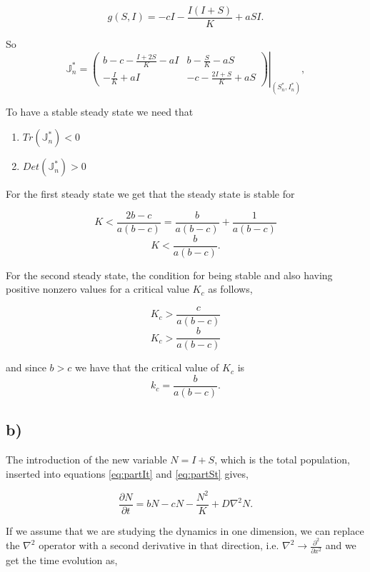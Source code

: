 \begin{equation}
g(S,I)=-cI-\frac{I(I+S)}{K}+aSI.
\end{equation}

So
\begin{equation}
\mathbb{J}^*_n=\left.\left(
\begin{array}{cc}
b-c-\frac{I+2S}{K}-aI & b-\frac{S}{K}-aS \\
-\frac{I}{K} +aI & -c -\frac{2I+S}{K}+aS
\end{array}\right)\right|_{(S^*_n,I^*_n)},
\end{equation}

To have a stable steady state we need that 

\begin{enumerate}
\item $Tr(\mathbb{J}^*_n)<0$
\item $Det(\mathbb{J}^*_n)>0$
\end{enumerate}


For the first steady state we get that the steady state is stable for

$$
K<\frac{2b-c}{a(b-c)}=\frac{b}{a(b-c)}+\frac{1}{a(b-c)}
$$$$
K<\frac{b}{a(b-c)}.
$$

For the second steady state, the condition for being stable and also having positive nonzero values for a critical value $K_c$ as follows,

$$
K_c>\frac{c}{a(b-c)}
$$$$
K_c>\frac{b}{a(b-c)}
$$

and since $b>c$ we have that the critical value of $K_c$ is
\begin{equation}
k_c=\frac{b}{a(b-c)}.
\end{equation}
\subsection*{b)}

The introduction of the new variable $N=I+S$, which is the total population, inserted into equations \eqref{eq:partIt} and \eqref{eq:partSt} gives,

\begin{equation}
\frac{\partial N}{\partial t}=bN -cN -\frac{N^2}{K}+D\nabla^2N.
\end{equation}

If we assume that we are studying the dynamics in one dimension, we can replace the $\nabla^2$ operator with a second derivative in that direction, i.e. $\nabla^2\rightarrow \frac{\partial^2}{\partial x^2}$ and we get the time evolution as,


